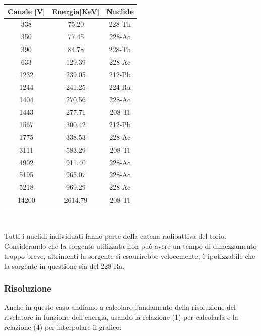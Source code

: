 \documentclass[a4paper,10pt]{article}
\begin{document}
\begin{center}
    \begin{tabular}{ccc}
        \toprule
        Canale [V] & Energia[KeV] & Nuclide\\
        \midrule
	  338 & 75.20 & 228-Th\\
	  350 & 77.45 & 228-Ac\\
	  390 & 84.78 & 228-Th\\
	  633 & 129.39 & 228-Ac\\
	  1232 & 239.05 & 212-Pb\\
	  1244 & 241.25 & 224-Ra\\
	  1404 & 270.56 & 228-Ac\\
	  1443 & 277.71 & 208-Tl\\
	  1567 & 300.42 & 212-Pb\\
	  1775 & 338.53 & 228-Ac\\
	  3111 & 583.29 & 208-Tl\\
	  4902 & 911.40 & 228-Ac\\
	  5195 & 965.07 & 228-Ac\\
	  5218 & 969.29 & 228-Ac\\
	  14200 & 2614.79 & 208-Tl\\
        \bottomrule
    \end{tabular}\\
\end{center}

Tutti i nuclidi individuati fanno parte della catena radioattiva del torio. Considerando che la sorgente utilizzata non pu\`o avere un tempo di dimezzamento troppo breve, altrimenti la sorgente si esaurirebbe velocemente, \`e ipotizzabile che la sorgente in questione sia del 228-Ra.


\subsubsection{Risoluzione}

Anche in questo caso andiamo a calcolare l'andamento della risoluzione del rivelatore in funzione dell'energia, usando la relazione (1) per calcolarla e la relazione (4) per interpolare il grafico:
\end{document}
